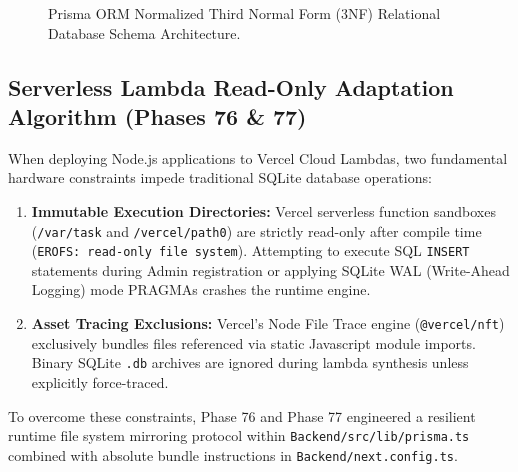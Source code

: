 \documentclass[12pt,a4paper]{article}
\begin{document}
\begin{figure}[H]
{
}
\caption{Prisma ORM Normalized Third Normal Form (3NF) Relational Database Schema Architecture.}
\label{fig:er_diagram}
\end{figure}

\subsection{Serverless Lambda Read-Only Adaptation Algorithm (Phases 76 \& 77)}
When deploying Node.js applications to Vercel Cloud Lambdas, two fundamental hardware constraints impede traditional SQLite database operations:
\begin{enumerate}[label=\textbf{\arabic*.}]
    \item \textbf{Immutable Execution Directories:} Vercel serverless function sandboxes (\texttt{/var/task} and \texttt{/vercel/path0}) are strictly read-only after compile time (\texttt{EROFS: read-only file system}). Attempting to execute SQL \texttt{INSERT} statements during Admin registration or applying SQLite WAL (Write-Ahead Logging) mode PRAGMAs crashes the runtime engine.
    \item \textbf{Asset Tracing Exclusions:} Vercel's Node File Trace engine (\texttt{@vercel/nft}) exclusively bundles files referenced via static Javascript module imports. Binary SQLite \texttt{.db} archives are ignored during lambda synthesis unless explicitly force-traced.
\end{enumerate}

To overcome these constraints, Phase 76 and Phase 77 engineered a resilient runtime file system mirroring protocol within \texttt{Backend/src/lib/prisma.ts} combined with absolute bundle instructions in \texttt{Backend/next.config.ts}.
\end{document}
